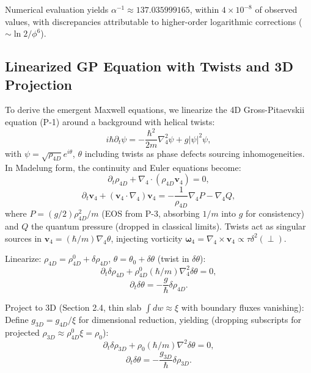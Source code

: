 \documentclass{article}
\begin{document}
Numerical evaluation yields \(\alpha^{-1} \approx 137.035999165\), within \(4 \times 10^{-8}\) of observed values, with discrepancies attributable to higher-order logarithmic corrections (\(\sim \ln 2 / \phi^6\)).

\subsection{Linearized GP Equation with Twists and 3D Projection}

To derive the emergent Maxwell equations, we linearize the 4D Gross-Pitaevskii equation (P-1) around a background with helical twists:
\begin{equation}
i \hbar \partial_t \psi = -\frac{\hbar^2}{2 m} \nabla_4^2 \psi + g |\psi|^2 \psi,
\end{equation}
with $\psi = \sqrt{\rho_{4D}} e^{i \theta}$, $\theta$ including twists as phase defects sourcing inhomogeneities. In Madelung form, the continuity and Euler equations become:
\begin{equation}
\partial_t \rho_{4D} + \nabla_4 \cdot (\rho_{4D} \mathbf{v}_4) = 0,
\end{equation}
\begin{equation}
\partial_t \mathbf{v}_4 + (\mathbf{v}_4 \cdot \nabla_4) \mathbf{v}_4 = -\frac{1}{\rho_{4D}} \nabla_4 P - \nabla_4 Q,
\end{equation}
where $P = (g / 2) \rho_{4D}^2 / m$ (EOS from P-3, absorbing $1/m$ into $g$ for consistency) and $Q$ the quantum pressure (dropped in classical limits). Twists act as singular sources in $\mathbf{v}_4 = (\hbar / m) \nabla_4 \theta$, injecting vorticity $\boldsymbol{\omega}_4 = \nabla_4 \times \mathbf{v}_4 \propto \tau \delta^2(\perp)$.

Linearize: $\rho_{4D} = \rho_{4D}^0 + \delta \rho_{4D}$, $\theta = \theta_0 + \delta \theta$ (twist in $\delta \theta$):
\begin{equation}
\partial_t \delta \rho_{4D} + \rho_{4D}^0 (\hbar / m) \nabla_4^2 \delta \theta = 0,
\end{equation}
\begin{equation}
\partial_t \delta \theta = -\frac{g}{\hbar} \delta \rho_{4D}.
\end{equation}

Project to 3D (Section 2.4, thin slab $\int dw \approx \xi$ with boundary fluxes vanishing): Define $g_{3D} = g_{4D} / \xi$ for dimensional reduction, yielding (dropping subscripts for projected $\rho_{3D} \approx \rho_{4D}^0 \xi = \rho_0$):
\begin{equation}
\partial_t \delta \rho_{3D} + \rho_0 (\hbar / m) \nabla^2 \delta \theta = 0,
\end{equation}
\begin{equation}
\partial_t \delta \theta = -\frac{g_{3D}}{\hbar} \delta \rho_{3D}.
\end{equation}
\end{document}
